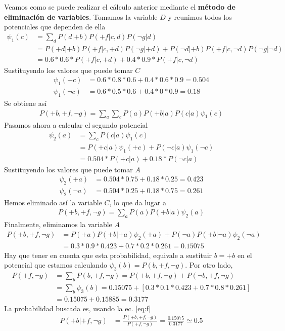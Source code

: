 \documentclass[12pt,a4paper]{article}
\begin{document}
Veamos como se puede realizar el cálculo anterior mediante el \textbf{método de eliminación de variables}. Tomamos la variable $D$ y reunimos todos los potenciales que dependen de ella
\begin{align*}
    \psi_1(c) & = \sum_d P(d | +b) P(+f | c, d) P(\neg g | d) \\
    & = P(+d | +b) P(+f | c, +d) P(\neg g | +d) + P(\neg d | +b) P(+f | c, \neg d) P(\neg g | \neg d) \\
    & = 0.6*0.6*P(+f | c, +d) + 0.4*0.9*P(+f | c, \neg d)
\end{align*} 
Sustituyendo los valores que puede tomar $C$
\begin{align*}
    \psi_1(+c) & = 0.6*0.8*0.6+0.4*0.6*0.9 = 0.504   \\
    \psi_1(\neg c) & = 0.6*0.5*0.6+0.4*0*0.9 = 0.18
\end{align*}
Se obtiene así 
\begin{align*}
    P(+b , +f, \neg g) = \sum_{a} \sum_{c} P(a) P(+b | a) P(c | a) \psi_1(c)
\end{align*}
Pasamos ahora a calcular el segundo potencial
\begin{align*}
    \psi_2(a) & = \sum_c P(c | a) \psi_1(c) \\
    & =  P(+c | a) \psi_1(+c) + P(\neg c | a) \psi_1(\neg c) \\
    & = 0.504*P(+c | a) + 0.18*P(\neg c | a)
\end{align*}
Sustituyendo los valores que puede tomar $A$
\begin{align*}
    \psi_2(+a) & = 0.504*0.75+0.18*0.25 = 0.423 \\
    \psi_2(\neg a) & = 0.504*0.25 + 0.18*0.75 = 0.261
\end{align*}
Hemos eliminado así la variable $C$, lo que da lugar a
\begin{align*}
    P(+b , +f, \neg g) = \sum_{a} P(a) P(+b | a) \psi_2(a)
\end{align*}
Finalmente, eliminamos la variable $A$
\begin{align*}
    P(+b , +f, \neg g) & = P(+a) P(+b | +a) \psi_2(+a) + P(\neg a) P(+b | \neg a) \psi_2(\neg a) \\
    & = 0.3*0.9*0.423+0.7*0.2*0.261 = 0.15075
\end{align*}
Hay que tener en cuenta que esta probabilidad, equivale a sustituir $b=+b$ en el potencial que estamos calculando $\psi_3(b) = P(b, +f, \neg g)$. Por otro lado,
\begin{align*}
    P(+f, \neg g) & = \sum_b P(b, +f, \neg g) = P(+b, +f, \neg g) + P(\neg b, +f, \neg g)\\
    & = \sum_b \psi_3(b) = 0.15075 + \left[ 0.3*0.1*0.423 + 0.7*0.8*0.261 \right] \\
    & = 0.15075 + 0.15885 = 0.3177
\end{align*}
La probabilidad buscada es, usando la ec. \eqref{eq:f}
\begin{align*}
    P(+b | +f, \neg g) & = \frac{P(+b , +f, \neg g)}{P(+f, \neg g)} = \frac{0.15075}{0.3177} \simeq 0.5
\end{align*}
\end{document}

